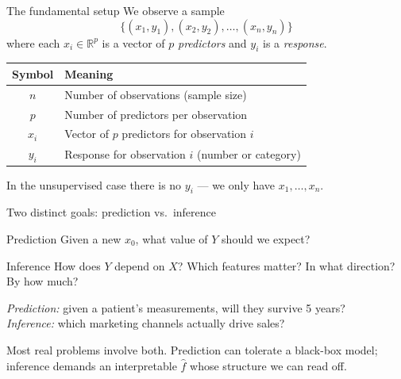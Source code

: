 \documentclass[aspectratio=169,11pt]{beamer}
\begin{document}
\begin{frame}{The fundamental setup}
  We observe a sample
  \[
    \boxed{\;\{(x_1, y_1), (x_2, y_2), \ldots, (x_n, y_n)\}\;}
  \]
  where each $x_i \in \mathbb{R}^p$ is a vector of $p$ \emph{predictors}
  and $y_i$ is a \emph{response}.
  \begin{readme}
    \begin{tabular}{@{}cl@{}}
      \toprule
      \textbf{Symbol} & \textbf{Meaning} \\
      \midrule
      $n$ & Number of observations (sample size) \\
      $p$ & Number of predictors per observation \\
      $x_i$ & Vector of $p$ predictors for observation $i$ \\
      $y_i$ & Response for observation $i$ (number or category) \\
      \bottomrule
    \end{tabular}
  \end{readme}
  In the unsupervised case there is no $y_i$ --- we only have
  $x_1, \ldots, x_n$.
\end{frame}

\begin{frame}{Two distinct goals: prediction vs.\ inference}
  \begin{block}{Prediction}
    Given a new $x_0$, what value of $Y$ should we expect?
  \end{block}
  \begin{block}{Inference}
    How does $Y$ depend on $X$? Which features matter? In what
    direction? By how much?
  \end{block}
  \begin{numexample}
    \emph{Prediction:} given a patient's measurements, will they
    survive 5 years?\\
    \emph{Inference:} which marketing channels actually drive sales?
  \end{numexample}
  \begin{takeaway}
    Most real problems involve both. Prediction can tolerate a
    black-box model; inference demands an interpretable $\hat f$ whose
    structure we can read off.
  \end{takeaway}
\end{frame}
\end{document}
